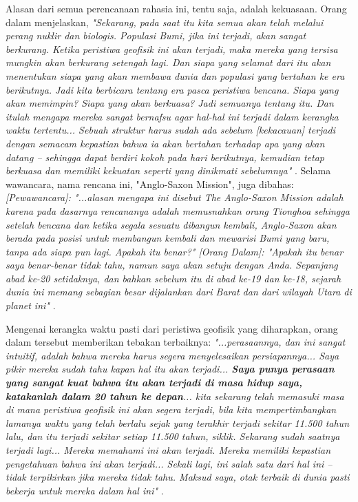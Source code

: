 \documentclass[10pt,twocolumn,letterpaper]{article}
\begin{document}
Alasan dari semua perencanaan rahasia ini, tentu saja, adalah kekuasaan. Orang dalam menjelaskan, \textit{"Sekarang, pada saat itu kita semua akan telah melalui perang nuklir dan biologis. Populasi Bumi, jika ini terjadi, akan sangat berkurang. Ketika peristiwa geofisik ini akan terjadi, maka mereka yang tersisa mungkin akan berkurang setengah lagi. Dan siapa yang selamat dari itu akan menentukan siapa yang akan membawa dunia dan populasi yang bertahan ke era berikutnya. Jadi kita berbicara tentang era pasca peristiwa bencana. Siapa yang akan memimpin? Siapa yang akan berkuasa? Jadi semuanya tentang itu. Dan itulah mengapa mereka sangat bernafsu agar hal-hal ini terjadi dalam kerangka waktu tertentu... Sebuah struktur harus sudah ada sebelum [kekacauan] terjadi dengan semacam kepastian bahwa ia akan bertahan terhadap apa yang akan datang -- sehingga dapat berdiri kokoh pada hari berikutnya, kemudian tetap berkuasa dan memiliki kekuatan seperti yang dinikmati sebelumnya"} \cite{4}. Selama wawancara, nama rencana ini, "Anglo-Saxon Mission", juga dibahas: \textit{[Pewawancara]: "...alasan mengapa ini disebut The Anglo-Saxon Mission adalah karena pada dasarnya rencananya adalah memusnahkan orang Tionghoa sehingga setelah bencana dan ketika segala sesuatu dibangun kembali, Anglo-Saxon akan berada pada posisi untuk membangun kembali dan mewarisi Bumi yang baru, tanpa ada siapa pun lagi. Apakah itu benar?" [Orang Dalam]: "Apakah itu benar saya benar-benar tidak tahu, namun saya akan setuju dengan Anda. Sepanjang abad ke-20 setidaknya, dan bahkan sebelum itu di abad ke-19 dan ke-18, sejarah dunia ini memang sebagian besar dijalankan dari Barat dan dari wilayah Utara di planet ini"} \cite{4}.

Mengenai kerangka waktu pasti dari peristiwa geofisik yang diharapkan, orang dalam tersebut memberikan tebakan terbaiknya: \textit{"...perasaannya, dan ini sangat intuitif, adalah bahwa mereka harus segera menyelesaikan persiapannya... Saya pikir mereka sudah tahu kapan hal itu akan terjadi... \textbf{Saya punya perasaan yang sangat kuat bahwa itu akan terjadi di masa hidup saya, katakanlah dalam 20 tahun ke depan}... kita sekarang telah memasuki masa di mana peristiwa geofisik ini akan segera terjadi, bila kita mempertimbangkan lamanya waktu yang telah berlalu sejak yang terakhir terjadi sekitar 11.500 tahun lalu, dan itu terjadi sekitar setiap 11.500 tahun, siklik. Sekarang sudah saatnya terjadi lagi... Mereka memahami ini akan terjadi. Mereka memiliki kepastian pengetahuan bahwa ini akan terjadi... Sekali lagi, ini salah satu dari hal ini -- tidak terpikirkan jika mereka tidak tahu. Maksud saya, otak terbaik di dunia pasti bekerja untuk mereka dalam hal ini"} \cite{4}.
\end{document}
